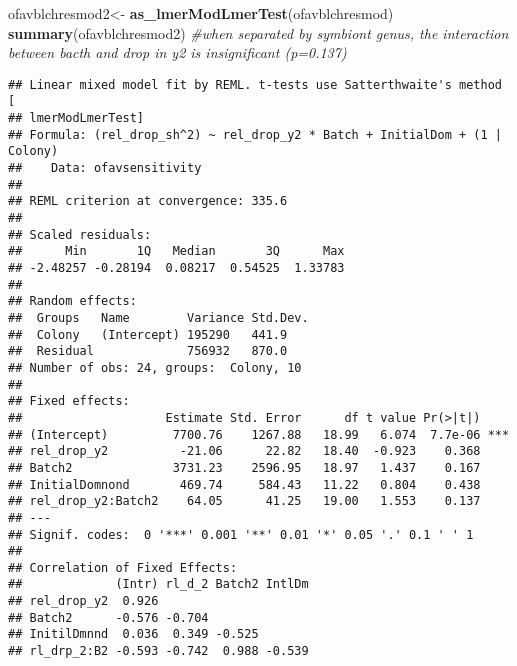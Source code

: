 \documentclass[]{article}
\newenvironment{Shaded}{\begin{snugshade}}{\end{snugshade}}
\newcommand{\CommentTok}[1]{\textcolor[rgb]{0.56,0.35,0.01}{\textit{#1}}}
\newcommand{\KeywordTok}[1]{\textcolor[rgb]{0.13,0.29,0.53}{\textbf{#1}}}
\newcommand{\NormalTok}[1]{#1}
\newcommand{\OperatorTok}[1]{\textcolor[rgb]{0.81,0.36,0.00}{\textbf{#1}}}
\newcommand{\StringTok}[1]{\textcolor[rgb]{0.31,0.60,0.02}{#1}}
\begin{document}
\begin{Shaded}
\begin{Highlighting}[]
\NormalTok{ofavblchresmod2<-}\StringTok{ }\KeywordTok{as_lmerModLmerTest}\NormalTok{(ofavblchresmod)}
\KeywordTok{summary}\NormalTok{(ofavblchresmod2) }\CommentTok{#when separated by symbiont genus, the interaction between bacth and drop in y2 is insignificant (p=0.137)}
\end{Highlighting}
\end{Shaded}

\begin{verbatim}
## Linear mixed model fit by REML. t-tests use Satterthwaite's method [
## lmerModLmerTest]
## Formula: (rel_drop_sh^2) ~ rel_drop_y2 * Batch + InitialDom + (1 | Colony)
##    Data: ofavsensitivity
## 
## REML criterion at convergence: 335.6
## 
## Scaled residuals: 
##      Min       1Q   Median       3Q      Max 
## -2.48257 -0.28194  0.08217  0.54525  1.33783 
## 
## Random effects:
##  Groups   Name        Variance Std.Dev.
##  Colony   (Intercept) 195290   441.9   
##  Residual             756932   870.0   
## Number of obs: 24, groups:  Colony, 10
## 
## Fixed effects:
##                    Estimate Std. Error      df t value Pr(>|t|)    
## (Intercept)         7700.76    1267.88   18.99   6.074  7.7e-06 ***
## rel_drop_y2          -21.06      22.82   18.40  -0.923    0.368    
## Batch2              3731.23    2596.95   18.97   1.437    0.167    
## InitialDomnond       469.74     584.43   11.22   0.804    0.438    
## rel_drop_y2:Batch2    64.05      41.25   19.00   1.553    0.137    
## ---
## Signif. codes:  0 '***' 0.001 '**' 0.01 '*' 0.05 '.' 0.1 ' ' 1
## 
## Correlation of Fixed Effects:
##             (Intr) rl_d_2 Batch2 IntlDm
## rel_drop_y2  0.926                     
## Batch2      -0.576 -0.704              
## InitilDmnnd  0.036  0.349 -0.525       
## rl_drp_2:B2 -0.593 -0.742  0.988 -0.539
\end{verbatim}

\begin{Shaded}
\end{Shaded}
\end{document}
